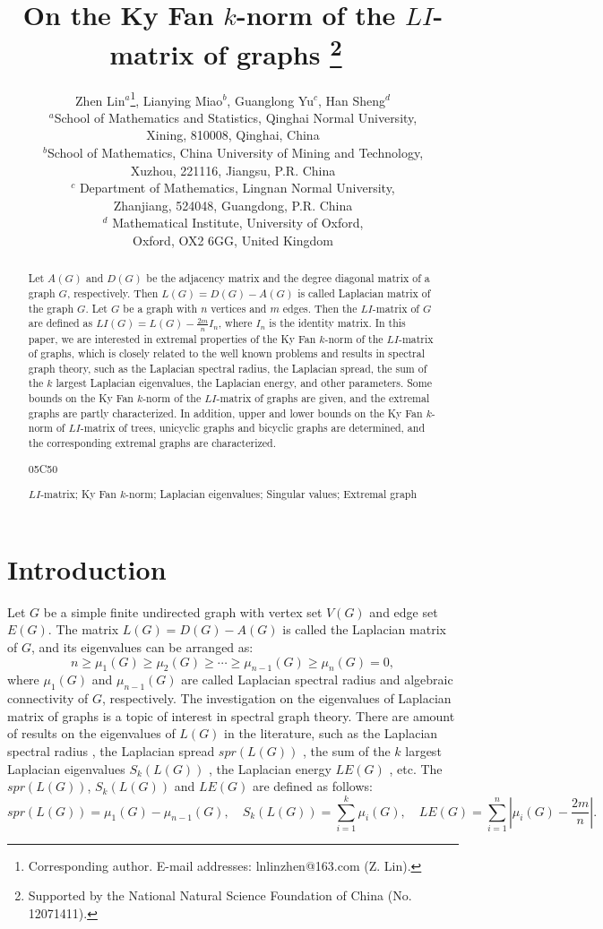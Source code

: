 \documentclass[12pt, a4paper]{article}
\title{{\Large \bf On the Ky Fan $k$-norm of the $LI$-matrix of graphs
\thanks{ Supported by the National Natural Science Foundation of China (No. 12071411).}~}}
\author{Zhen Lin$^a$\thanks{Corresponding author. E-mail addresses:
lnlinzhen@163.com (Z. Lin).},  Lianying Miao$^b$, Guanglong Yu$^c$, Han Sheng$^d$\\
{\footnotesize $^a$School of Mathematics and Statistics, Qinghai Normal University,}\\ {\footnotesize Xining, 810008, Qinghai, China }\\
\footnotesize $^b$School of Mathematics, China University of Mining and Technology,\\
 \footnotesize Xuzhou, 221116, Jiangsu, P.R. China\\
\footnotesize  $^c$ Department of Mathematics, Lingnan Normal University,
\\  \footnotesize  Zhanjiang, 524048, Guangdong, P.R. China \\
\footnotesize  $^d$ Mathematical Institute, University of Oxford,
\\  \footnotesize   Oxford, OX2 6GG, United Kingdom
}
\date{}
\begin{document}
\jot
\date{}\maketitle
\begin{abstract}
Let $A(G)$ and $D(G)$ be the adjacency matrix and the degree diagonal matrix of a graph $G$, respectively. Then $L(G)=D(G)-A(G)$ is called Laplacian matrix of the graph $G$. Let $G$ be a graph with $n$ vertices and $m$ edges. Then the $LI$-matrix of $G$ are defined as
$LI(G)=L(G)-\frac{2m}{n}I_n$,
where $I_n$ is the identity matrix. In this paper, we are interested in extremal properties of the Ky Fan $k$-norm of the $LI$-matrix of graphs, which is closely related to the well known problems and results in spectral graph theory, such as the Laplacian spectral radius, the Laplacian spread, the sum of the $k$ largest Laplacian eigenvalues, the Laplacian energy, and other parameters. Some bounds on the Ky Fan $k$-norm of the $LI$-matrix of graphs are given, and the extremal graphs are partly characterized. In addition, upper and lower bounds on the Ky Fan $k$-norm of $LI$-matrix of trees, unicyclic graphs and bicyclic graphs are determined, and the corresponding extremal graphs are characterized.

\bigskip

 05C50

 $LI$-matrix; Ky Fan $k$-norm; Laplacian eigenvalues; Singular values; Extremal graph
\end{abstract}
\baselineskip 20pt

\section{\large Introduction}
Let $G$ be a simple finite undirected graph with vertex set $V(G)$ and edge set $E(G)$.
The matrix $L(G)=D(G)-A(G)$ is called the Laplacian matrix of $G$, and its eigenvalues can be arranged as:
$$n\geq \mu_1(G)\geq \mu_2(G)\geq \cdots \geq \mu_{n-1}(G)\geq \mu_n(G)=0,$$
where $\mu_1(G)$ and $\mu_{n-1}(G)$ are called Laplacian spectral radius and algebraic connectivity of $G$, respectively. The investigation on the eigenvalues of Laplacian matrix of graphs is a topic of interest in spectral graph theory. There are amount of results on the eigenvalues of $L(G)$ in the literature, such as the Laplacian spectral radius \cite{GLS, PS}, the Laplacian spread $spr(L(G))$ \cite{AGRR, EK, ZSH}, the sum of the $k$ largest Laplacian eigenvalues $S_k(L(G))$ \cite{FHRT, GPRT, HMT}, the Laplacian energy $LE(G)$ \cite{DG, DMG, GZ}, etc. The $spr(L(G))$, $S_k(L(G))$ and $LE(G)$ are defined as follows:
$$spr(L(G))=\mu_1(G)-\mu_{n-1}(G), \quad S_k(L(G))=\sum\limits_{i=1}^{k}\mu_i(G), \quad LE(G)=\sum\limits_{i=1}^{n}\left\lvert \mu_i(G)-\frac{2m}{n} \right\rvert.$$
\end{document}
